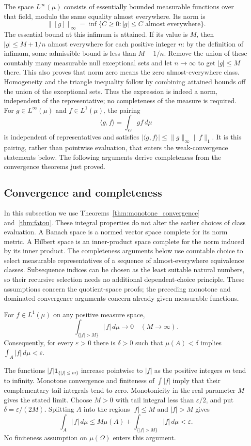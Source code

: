 The space $L^\infty(\mu)$ consists of essentially bounded measurable
functions over that field, modulo the same equality almost everywhere.
Its norm is
\[
\|[g]\|_\infty=\inf\{C\geq0:|g|\leq C\text{ almost everywhere}\}.
\]
The essential bound at this infimum is attained. If its value is $M$,
then $|g|\leq M+1/n$ almost everywhere for each positive integer $n$:
by the definition of infimum, some admissible bound is less than
$M+1/n$. Remove the union of these countably many measurable null
exceptional sets and let $n\to\infty$ to get $|g|\leq M$ there.
This also proves that norm zero means the zero almost-everywhere class.
Homogeneity and the triangle inequality follow by combining attained
bounds off the union of the exceptional sets. Thus the expression is
indeed a norm, independent of the representative; no completeness of
the measure is required. For
$g\in L^\infty(\mu)$ and $f\in L^1(\mu)$, the pairing
\[
\langle g,f\rangle=\int_\Omega gf\,d\mu
\]
is independent of representatives and satisfies
$|\langle g,f\rangle|\leqslant\|g\|_\infty\|f\|_1$.
It is this pairing, rather than pointwise evaluation, that enters the
weak-convergence statements below. The following arguments derive
completeness from the convergence theorems just proved.

\subsection{Convergence and completeness}
In this subsection we use Theorems~\ref{thm:monotone_convergence}
and~\ref{thm:fatou}. These integral properties do not alter the earlier
choices of class evaluation.
A Banach space is a normed vector space complete for its norm metric.
A Hilbert space is an inner-product space complete for the norm induced
by its inner product.
The completeness arguments below use countable choice to select
measurable representatives of a sequence of almost-everywhere equivalence
classes. Subsequence indices can be chosen as the least suitable natural
numbers, so their recursive selection needs no additional dependent-choice
principle. These assumptions concern the quotient-space proofs; the
preceding monotone and dominated convergence arguments concern already
given measurable functions.

\begin{lemma}
For $f\in L^1(\mu)$ on any positive measure space,
\[
\int_{\{|f|>M\}}|f|\,d\mu\longrightarrow0
\quad(M\to\infty).
\]
Consequently, for every $\varepsilon>0$ there is $\delta>0$ such that
$\mu(A)<\delta$ implies $\int_A|f|\,d\mu<\varepsilon$.
\end{lemma}
\Proof
The functions $|f|\mathbf1_{\{|f|\leqslant m\}}$ increase pointwise
to $|f|$ as the positive integers $m$ tend to infinity. Monotone
convergence and finiteness of $\int|f|$ imply that their complementary
tail integrals tend to zero. Monotonicity in the real parameter $M$
gives the stated limit. Choose $M>0$ with tail integral less than
$\varepsilon/2$, and put $\delta=\varepsilon/(2M)$. Splitting $A$
into the regions $|f|\leqslant M$ and $|f|>M$ gives
\[
\int_A|f|\,d\mu\leqslant M\mu(A)
 +\int_{\{|f|>M\}}|f|\,d\mu<\varepsilon.
\]
No finiteness assumption on $\mu(\Omega)$ enters this argument.
\Done

